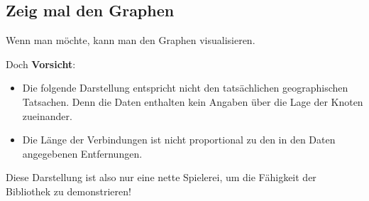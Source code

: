 \documentclass[11pt]{article}
\providecommand{\tightlist}{%
      \setlength{\itemsep}{0pt}\setlength{\parskip}{0pt}}
\begin{document}
    \hypertarget{zeig-mal-den-graphen}{%
\subsection{Zeig mal den Graphen}\label{zeig-mal-den-graphen}}

    Wenn man möchte, kann man den Graphen visualisieren.

Doch \textbf{Vorsicht}:

\begin{itemize}
\tightlist
\item
  Die folgende Darstellung entspricht nicht den tatsächlichen
  geographischen Tatsachen. Denn die Daten enthalten kein Angaben über
  die Lage der Knoten zueinander.
\item
  Die Länge der Verbindungen ist nicht proportional zu den in den Daten
  angegebenen Entfernungen.
\end{itemize}

Diese Darstellung ist also nur eine nette Spielerei, um die Fähigkeit
der Bibliothek zu demonstrieren!
\end{document}
